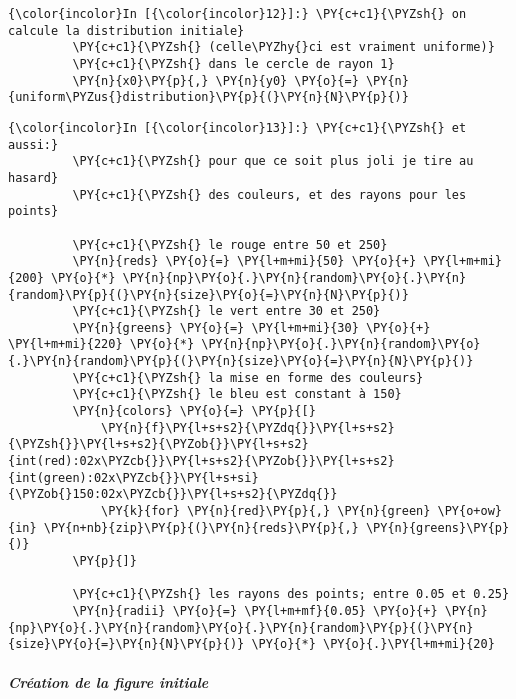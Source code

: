     \begin{Verbatim}[commandchars=\\\{\},frame=single,framerule=0.3mm,rulecolor=\color{cellframecolor}]
{\color{incolor}In [{\color{incolor}12}]:} \PY{c+c1}{\PYZsh{} on calcule la distribution initiale}
         \PY{c+c1}{\PYZsh{} (celle\PYZhy{}ci est vraiment uniforme)}
         \PY{c+c1}{\PYZsh{} dans le cercle de rayon 1}
         \PY{n}{x0}\PY{p}{,} \PY{n}{y0} \PY{o}{=} \PY{n}{uniform\PYZus{}distribution}\PY{p}{(}\PY{n}{N}\PY{p}{)}
\end{Verbatim}


    \begin{Verbatim}[commandchars=\\\{\},frame=single,framerule=0.3mm,rulecolor=\color{cellframecolor}]
{\color{incolor}In [{\color{incolor}13}]:} \PY{c+c1}{\PYZsh{} et aussi:}
         \PY{c+c1}{\PYZsh{} pour que ce soit plus joli je tire au hasard}
         \PY{c+c1}{\PYZsh{} des couleurs, et des rayons pour les points}
         
         \PY{c+c1}{\PYZsh{} le rouge entre 50 et 250}
         \PY{n}{reds} \PY{o}{=} \PY{l+m+mi}{50} \PY{o}{+} \PY{l+m+mi}{200} \PY{o}{*} \PY{n}{np}\PY{o}{.}\PY{n}{random}\PY{o}{.}\PY{n}{random}\PY{p}{(}\PY{n}{size}\PY{o}{=}\PY{n}{N}\PY{p}{)}
         \PY{c+c1}{\PYZsh{} le vert entre 30 et 250}
         \PY{n}{greens} \PY{o}{=} \PY{l+m+mi}{30} \PY{o}{+} \PY{l+m+mi}{220} \PY{o}{*} \PY{n}{np}\PY{o}{.}\PY{n}{random}\PY{o}{.}\PY{n}{random}\PY{p}{(}\PY{n}{size}\PY{o}{=}\PY{n}{N}\PY{p}{)}
         \PY{c+c1}{\PYZsh{} la mise en forme des couleurs}
         \PY{c+c1}{\PYZsh{} le bleu est constant à 150}
         \PY{n}{colors} \PY{o}{=} \PY{p}{[}
             \PY{n}{f}\PY{l+s+s2}{\PYZdq{}}\PY{l+s+s2}{\PYZsh{}}\PY{l+s+s2}{\PYZob{}}\PY{l+s+s2}{int(red):02x\PYZcb{}}\PY{l+s+s2}{\PYZob{}}\PY{l+s+s2}{int(green):02x\PYZcb{}}\PY{l+s+si}{\PYZob{}150:02x\PYZcb{}}\PY{l+s+s2}{\PYZdq{}}
             \PY{k}{for} \PY{n}{red}\PY{p}{,} \PY{n}{green} \PY{o+ow}{in} \PY{n+nb}{zip}\PY{p}{(}\PY{n}{reds}\PY{p}{,} \PY{n}{greens}\PY{p}{)}
         \PY{p}{]}
         
         \PY{c+c1}{\PYZsh{} les rayons des points; entre 0.05 et 0.25}
         \PY{n}{radii} \PY{o}{=} \PY{l+m+mf}{0.05} \PY{o}{+} \PY{n}{np}\PY{o}{.}\PY{n}{random}\PY{o}{.}\PY{n}{random}\PY{p}{(}\PY{n}{size}\PY{o}{=}\PY{n}{N}\PY{p}{)} \PY{o}{*} \PY{o}{.}\PY{l+m+mi}{20}
\end{Verbatim}


    \hypertarget{cruxe9ation-de-la-figure-initiale}{%
\subparagraph{Création de la figure
initiale}\label{cruxe9ation-de-la-figure-initiale}}

